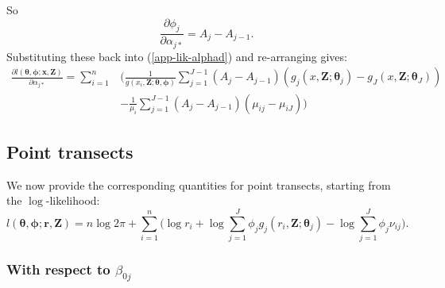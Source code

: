 \documentclass[10pt]{article}
\begin{document}
So
\begin{equation*}
\frac{\partial \phi_j}{\partial \alpha_{j*}} = A_j - A_{j-1}.
\end{equation*}
Substituting these back into (\ref{app-lik-alphad}) and re-arranging gives:
\begin{align*}
\frac{\partial l(\boldsymbol{\theta},\boldsymbol{\phi}; \mathbf{x},\mathbf{Z})}{\partial \alpha_{j*}} = \sum_{i=1}^n & \Big( \frac{1}{g(x_i,\mathbf{Z}; \boldsymbol{\theta},\boldsymbol{\phi})} \sum_{j=1}^{J-1} (A_j - A_{j-1}) (g_j(x,\mathbf{Z}; \boldsymbol{\theta}_j) - g_J(x,\mathbf{Z}; \boldsymbol{\theta}_J))\\
&- \frac{1}{\mu_i} \sum_{j=1}^{J-1}(A_j - A_{j-1})(\mu_{ij} - \mu_{iJ}) \Big)
\end{align*}

\subsection*{Point transects}

We now provide the corresponding quantities for point transects, starting from the $\log$-likelihood:
\begin{equation}
l(\boldsymbol{\theta}, \boldsymbol{\phi}; \mathbf{r},\mathbf{Z}) = n \log 2 \pi + \sum_{i=1}^n \Big( \log r_i + \log \sum_{j=1}^J \phi_j g_j(r_i,\mathbf{Z}; \boldsymbol{\theta}_j) - \log \sum_{j=1}^J \phi_j \nu_{ij}\Big).
\label{pt-lik}
\end{equation}


\subsubsection*{With respect to $\beta_{0j}$}
\end{document}
